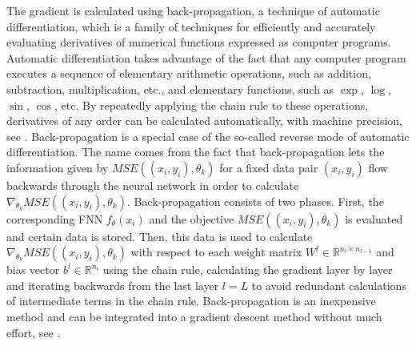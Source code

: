 The gradient is calculated using back-propagation, a technique of automatic differentiation, which is a family of techniques for efficiently and accurately evaluating derivatives of numerical functions expressed as computer programs. Automatic differentiation takes advantage of the fact that any computer program executes a sequence of elementary arithmetic operations, such as addition, subtraction, multiplication, etc., and elementary functions, such as $\exp$, $\log$, $\sin$, $\cos$, etc. By repeatedly applying the chain rule to these operations, derivatives of any order can be calculated automatically, with machine precision, see \cite{BaydinPearlmutterAndreyevich:2018}. Back-propagation is a special case of the so-called reverse mode of automatic differentiation. The name comes from the fact that back-propagation lets the information given by $MSE((x_i, y_i), \theta_k)$ for a fixed data pair $(x_i, y_i)$ flow backwards through the neural network in order to calculate $\nabla_{\theta_k} MSE((x_i, y_i), \theta_k)$. Back-propagation consists of two phases. First, the corresponding FNN $f_{\theta} \left(x_{i}\right)$ and the objective $MSE((x_i, y_i), \theta_k)$ is evaluated and certain data is stored. Then, this data is used to calculate $\nabla_{\theta_k} MSE((x_i, y_i), \theta_k)$ with respect to each weight matrix $W^l \in \mathbb{R}^{n_l \times n_{l-1}}$ and bias vector $b^l \in \mathbb{R}^{n_l}$ using the chain rule, calculating the gradient layer by layer and iterating backwards from the last layer $l=L$ to avoid redundant calculations of intermediate terms in the chain rule. Back-propagation is an inexpensive method and can be integrated into a gradient descent method without much effort, see \cite[section~6.5]{GoodfellowBengioCourville:2016}.\\

